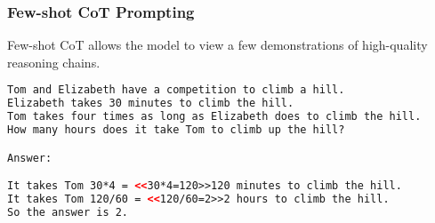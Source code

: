 



\begin{frame}[fragile]\frametitle{Few-shot CoT Prompting}

Few-shot CoT allows the model to view a few demonstrations of high-quality reasoning chains.

\begin{lstlisting}[language=HTML]
Tom and Elizabeth have a competition to climb a hill.
Elizabeth takes 30 minutes to climb the hill.
Tom takes four times as long as Elizabeth does to climb the hill.
How many hours does it take Tom to climb up the hill?

Answer:

It takes Tom 30*4 = <<30*4=120>>120 minutes to climb the hill.
It takes Tom 120/60 = <<120/60=2>>2 hours to climb the hill.
So the answer is 2.

\end{lstlisting} %


\end{frame}

